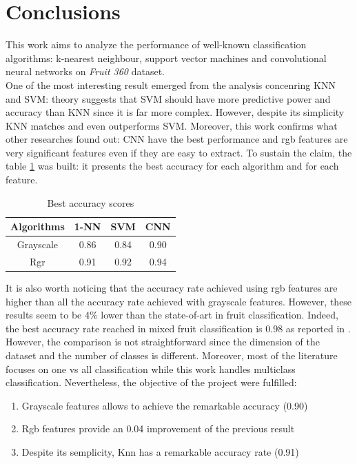 \documentclass{article}
\begin{document}
\section{Conclusions}
This work aims to analyze the performance of well-known classification algorithms: k-nearest neighbour, support vector machines and convolutional neural networks on \textit{Fruit 360} dataset.\\
One of the most interesting result emerged from the analysis concenring KNN and SVM: theory suggests that SVM should have more predictive power and accuracy than KNN since it is far more complex. However, despite its simplicity KNN matches and even outperforms SVM. Moreover, this work confirms what other researches found out: CNN have the best performance and rgb features are very significant features even if they are easy to extract. To sustain the claim, the table \ref{results} was built: it presents the best accuracy for each algorithm and for each feature.
\begin{table}[H]
\centering
 \begin{tabular}{|c|c|c|c|} 
 \hline
  Algorithms & 1-NN & SVM & CNN\\
 \hline
 Grayscale&0.86&0.84&0.90 \\
 \hline
 Rgr&0.91& 0.92 & 0.94  \\
 \hline
\end{tabular}
\caption{Best accuracy scores} \label{results}
\end{table}
\noindent It is also worth noticing that the accuracy rate achieved using rgb features are higher than all the accuracy rate achieved with grayscale features. However, these results seem to be 4\% lower than the state-of-art in fruit classification. Indeed, the best accuracy rate reached in mixed fruit classification is 0.98 as reported in \cite{review}. However, the comparison is not straightforward since the dimension of the dataset and the number of classes is different. Moreover, most of the literature focuses on one vs all classification while this work handles multiclass classification. Nevertheless, the objective of the project were fulfilled:
\begin{enumerate}
\item Grayscale features allows to achieve the remarkable accuracy (0.90)
\item Rgb features provide an 0.04 improvement of the previous result
\item Despite its semplicity, Knn has a remarkable accuracy rate (0.91)
\end{enumerate}
\end{document}
